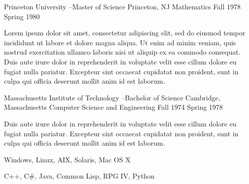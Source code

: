 \documentclass[10pt,letterpaper]{article}
\begin{document}
\education
\begin{itemize}

  \university
  {Princeton University} %
  {--Master of Science}  %
  {Princeton, NJ}        %
  {Mathematics}          %
  {Fall 1978}            %
  {Spring 1980}          %

  Lorem ipsum dolor sit amet, consectetur adipiscing elit, sed do eiusmod
  tempor incididunt ut labore et dolore magna aliqua. Ut enim ad minim veniam,
  quis nostrud exercitation ullamco laboris nisi ut aliquip ex ea commodo
  consequat. Duis aute irure dolor in reprehenderit in voluptate velit esse
  cillum dolore eu fugiat nulla pariatur. Excepteur sint occaecat cupidatat
  non proident, sunt in culpa qui officia deserunt mollit anim id est laborum.

  \university
  {Massachusetts Institute of Technology}
  {--Bachelor of Science}
  {Cambridge, Massachusetts}
  {Computer Science and Engineering}
  {Fall 1974}
  {Spring 1978}

  Duis aute irure dolor in reprehenderit in voluptate velit esse
  cillum dolore eu fugiat nulla pariatur. Excepteur sint occaecat cupidatat
  non proident, sunt in culpa qui officia deserunt mollit anim id est laborum.
  
\end{itemize}

  \skills                                
    {\item \os Windows, Linux, AIX, Solaris, Mac OS X
     \item \programming C++, C\#, Java, Common Lisp, RPG IV, Python}
  
\end{document}
